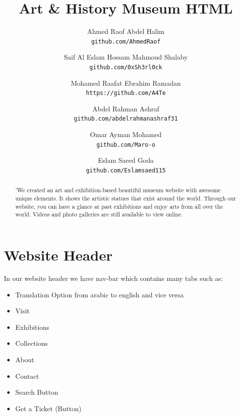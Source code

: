\documentclass{article}
\begin{document}
\title{Art \& History Museum HTML}
\author{
  Ahmed Raof Abdel Halim\\
  \texttt{github.com/AhmedRaof}
  \and
  Saif Al Eslam Hossam Mahmoud Shalaby\\
  \texttt{github.com/0xSh3rl0ck}
  \and
  Mohamed Raafat Ebrahim Ramadan\\
  \texttt{https://github.com/A4Te}
  \and
  Abdel Rahman Ashraf \\
  \texttt{github.com/abdelrahmanashraf31}
  \and
  Omar Ayman Mohamed \\
  \texttt{github.com/Maro-o}
  \and
  Eslam Saeed Goda \\
  \texttt{github.com/Eslamsaed115}
}
\date{}
\maketitle
\begin{abstract}
'We created an art and exhibition-based beautiful museum website with awesome unique elements. It shows the artistic statues that exist around the world. Through our website, you can have a glance at past exhibitions and enjoy arts from all over the world. Videos and photo galleries are still available to view online.
\end{abstract}
\section{Website Header}
In our website header we have nav-bar which contains many tabs such as:
\begin{itemize}
\item Translation Option from arabic to english and vice versa
\item Visit
\item Exhibitions
\item Collections
\item About
\item Contact
\item Search Button
\item Get a Ticket (Button)
\end{itemize}
\end{document}
